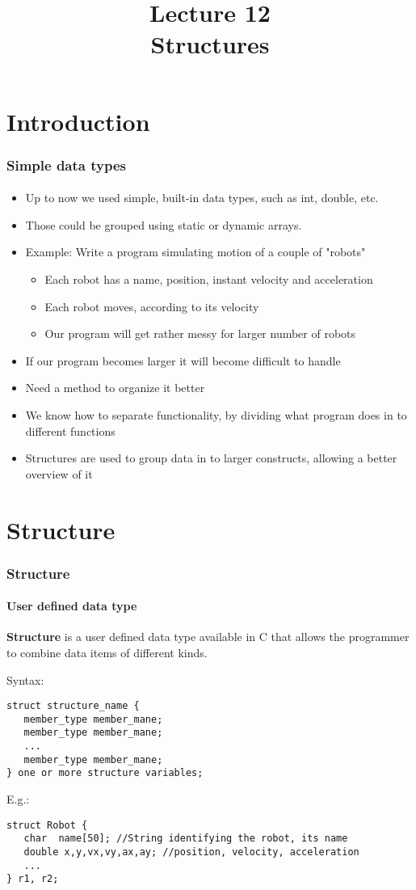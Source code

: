 \documentclass[10pt]{beamer}
\title{Lecture 12\\Structures}
\date{}
\begin{document}
\frame{
    \titlepage
}

\section{Introduction}

\begin{frame}[fragile]
  \frametitle{Simple data types}
  \framesubtitle{}  
\centering

\begin{itemize}
  \item Up to now we used simple, built-in data types, such as int, double, etc.
  \item Those could be grouped using static or dynamic arrays.
  \item Example: Write a program simulating motion of a couple of "robots"
  \begin{itemize}
    \item Each robot has a name, position, instant velocity and acceleration
    \item Each robot moves, according to its velocity
    \item Our program will get rather messy for larger number of robots
  \end{itemize}
  \item If our program becomes larger it will become difficult to handle
  \item Need a method to organize it better
  \item We know how to separate functionality,
  by dividing what program does in to different functions
  \item Structures are used to group data in to larger constructs,
  allowing a better overview of it
\end{itemize}

\end{frame}

\section{Structure}

\begin{frame}[fragile]
  \frametitle{Structure}
  \framesubtitle{User defined data type}  

\textbf{Structure} is a user defined data type available in C that allows the programmer to combine data items of different kinds.

\vspace{0.2cm}
Syntax:\vspace{0.1cm}
\begin{lstlisting}
struct structure_name {
   member_type member_mane;
   member_type member_mane;
   ...
   member_type member_mane;
} one or more structure variables;  
\end{lstlisting}

E.g.:\vspace{0.2cm}
\begin{lstlisting}
struct Robot {
   char  name[50]; //String identifying the robot, its name
   double x,y,vx,vy,ax,ay; //position, velocity, acceleration
   ...
} r1, r2; 
\end{lstlisting}
\end{frame}
\end{document}

